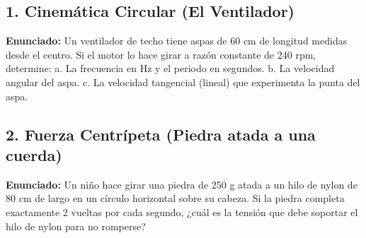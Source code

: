 \documentclass[12pt, letterpaper]{article}
\begin{document}
	\vspace{0.5cm}
	
	\subsection*{1. Cinemática Circular (El Ventilador)}
	\noindent \textbf{Enunciado:} Un ventilador de techo tiene aspas de 60 cm de longitud medidas desde el centro. Si el motor lo hace girar a razón constante de 240 rpm, determine: a. La frecuencia en Hz y el periodo en segundos. b. La velocidad angular del aspa. c. La velocidad tangencial (lineal) que experimenta la punta del aspa.
	
	
	\subsection*{2. Fuerza Centrípeta (Piedra atada a una cuerda)}
	\noindent \textbf{Enunciado:} Un niño hace girar una piedra de 250 g atada a un hilo de nylon de 80 cm de largo en un círculo horizontal sobre su cabeza. Si la piedra completa exactamente 2 vueltas por cada segundo, ¿cuál es la tensión que debe soportar el hilo de nylon para no romperse?
	
	
\end{document}
